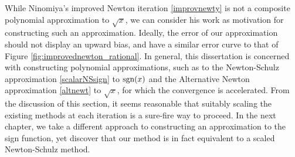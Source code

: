 \bigskip{}

While Ninomiya's improved Newton iteration \eqref{improvnewty} is not a composite polynomial approximation to $\sqrt{x}$, we can consider his work as motivation for constructing such an approximation. Ideally, the error of our approximation should not display an upward bias, and have a similar error curve to that of Figure \ref{fig:improvednewton_rational}. In general, this dissertation is concerned with constructing polynomial approximations, such as to the Newton-Schulz approximation \eqref{scalarNSsign} to $\text{sgn}(x)$ and the Alternative Newton approximation \eqref{altnewt} to $\sqrt{x}$, for which the convergence is accelerated. From the discussion of this section, it seems reasonable that suitably scaling the existing methods at each iteration is a sure-fire way to proceed. In the next chapter, we take a different approach to constructing an approximation to the sign function, yet discover that our method is in fact equivalent to a scaled Newton-Schulz method.







